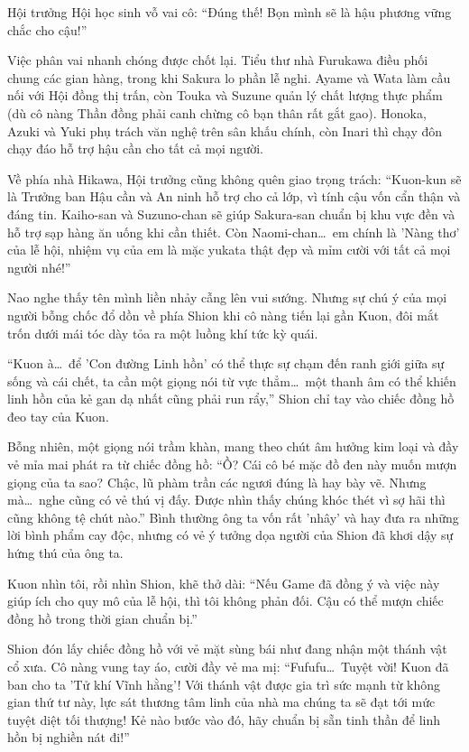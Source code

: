 \documentclass[../main.tex]{subfiles}
\begin{document}
Hội trưởng Hội học sinh vỗ vai cô: ``Đúng thế! Bọn mình sẽ là hậu phương vững chắc cho cậu!''

Việc phân vai nhanh chóng được chốt lại. Tiểu thư nhà Furukawa điều phối chung các gian hàng, trong khi Sakura lo phần lễ nghi. Ayame và Wata làm cầu nối với Hội đồng thị trấn, còn Touka và Suzune quản lý chất lượng thực phẩm (dù cô nàng Thần đồng phải canh chừng cô bạn thân rất gắt gao). Honoka, Azuki và Yuki phụ trách văn nghệ trên sân khấu chính, còn Inari thì chạy đôn chạy đáo hỗ trợ hậu cần cho tất cả mọi người.

Về phía nhà Hikawa, Hội trưởng cũng không quên giao trọng trách: ``Kuon-kun sẽ là Trưởng ban Hậu cần và An ninh hỗ trợ cho cả lớp, vì tính cậu vốn cẩn thận và đáng tin. Kaiho-san và Suzuno-chan sẽ giúp Sakura-san chuẩn bị khu vực đền và hỗ trợ sạp hàng ăn uống khi cần thiết. Còn Naomi-chan\dots\ em chính là 'Nàng thơ' của lễ hội, nhiệm vụ của em là mặc yukata thật đẹp và mỉm cười với tất cả mọi người nhé!''

Nao nghe thấy tên mình liền nhảy cẫng lên vui sướng. Nhưng sự chú ý của mọi người bỗng chốc đổ dồn về phía Shion khi cô nàng tiến lại gần Kuon, đôi mắt trốn dưới mái tóc dày tỏa ra một luồng khí tức kỳ quái.

``Kuon à\dots\ để 'Con đường Linh hồn' có thể thực sự chạm đến ranh giới giữa sự sống và cái chết, ta cần một giọng nói từ vực thẳm\dots\ một thanh âm có thể khiến linh hồn của kẻ gan dạ nhất cũng phải run rẩy,'' Shion chỉ tay vào chiếc đồng hồ đeo tay của Kuon.

Bỗng nhiên, một giọng nói trầm khàn, mang theo chút âm hưởng kim loại và đầy vẻ mỉa mai phát ra từ chiếc đồng hồ: ``Ồ? Cái cô bé mặc đồ đen này muốn mượn giọng của ta sao? Chậc, lũ phàm trần các ngươi đúng là hay bày vẽ. Nhưng mà\dots\ nghe cũng có vẻ thú vị đấy. Được nhìn thấy chúng khóc thét vì sợ hãi thì cũng không tệ chút nào.'' Bình thường ông ta vốn rất 'nhây' và hay đưa ra những lời bình phẩm cay độc, nhưng có vẻ ý tưởng dọa người của Shion đã khơi dậy sự hứng thú của ông ta.

Kuon nhìn tôi, rồi nhìn Shion, khẽ thở dài: ``Nếu Game đã đồng ý và việc này giúp ích cho quy mô của lễ hội, thì tôi không phản đối. Cậu có thể mượn chiếc đồng hồ trong thời gian chuẩn bị.''

Shion đón lấy chiếc đồng hồ với vẻ mặt sùng bái như đang nhận một thánh vật cổ xưa. Cô nàng vung tay áo, cười đầy vẻ ma mị: ``Fufufu\dots\ Tuyệt vời! Kuon đã ban cho ta 'Tử khí Vĩnh hằng'! Với thánh vật được gia trì sức mạnh từ không gian thứ tư này, lực sát thương tâm linh của nhà ma chúng ta sẽ đạt tới mức tuyệt diệt tối thượng! Kẻ nào bước vào đó, hãy chuẩn bị sẵn tinh thần để linh hồn bị nghiền nát đi!''
\end{document}
